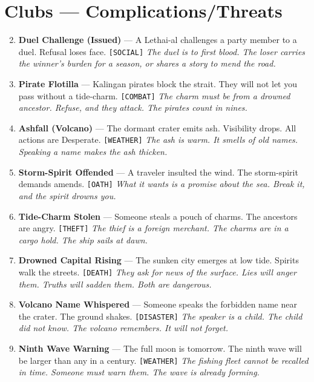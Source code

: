 \section*{Clubs --- Complications/Threats}
\label{sec:lethai-al-complications}
\begin{enumerate}
\setcounter{enumi}{1}
\item {} \textbf{Duel Challenge (Issued)} --- A Lethai-al challenges a party member to a duel. Refusal loses face. \texttt{[SOCIAL]}
  \hfill \textit{The duel is to first blood. The loser carries the winner's burden for a season, or shares a story to mend the road.}
\item {} \textbf{Pirate Flotilla} --- Kalingan pirates block the strait. They will not let you pass without a tide-charm. \texttt{[COMBAT]}
  \hfill \textit{The charm must be from a drowned ancestor. Refuse, and they attack. The pirates count in nines.}
\item {} \textbf{Ashfall (Volcano)} --- The dormant crater emits ash. Visibility drops. All actions are Desperate. \texttt{[WEATHER]}
  \hfill \textit{The ash is warm. It smells of old names. Speaking a name makes the ash thicken.}
\item {} \textbf{Storm-Spirit Offended} --- A traveler insulted the wind. The storm-spirit demands amends. \texttt{[OATH]}
  \hfill \textit{What it wants is a promise about the sea. Break it, and the spirit drowns you.}
\item {} \textbf{Tide-Charm Stolen} --- Someone steals a pouch of charms. The ancestors are angry. \texttt{[THEFT]}
  \hfill \textit{The thief is a foreign merchant. The charms are in a cargo hold. The ship sails at dawn.}
\item {} \textbf{Drowned Capital Rising} --- The sunken city emerges at low tide. Spirits walk the streets. \texttt{[DEATH]}
  \hfill \textit{They ask for news of the surface. Lies will anger them. Truths will sadden them. Both are dangerous.}
\item {} \textbf{Volcano Name Whispered} --- Someone speaks the forbidden name near the crater. The ground shakes. \texttt{[DISASTER]}
  \hfill \textit{The speaker is a child. The child did not know. The volcano remembers. It will not forget.}
\item {} \textbf{Ninth Wave Warning} --- The full moon is tomorrow. The ninth wave will be larger than any in a century. \texttt{[WEATHER]}
  \hfill \textit{The fishing fleet cannot be recalled in time. Someone must warn them. The wave is already forming.}

\end{enumerate}

